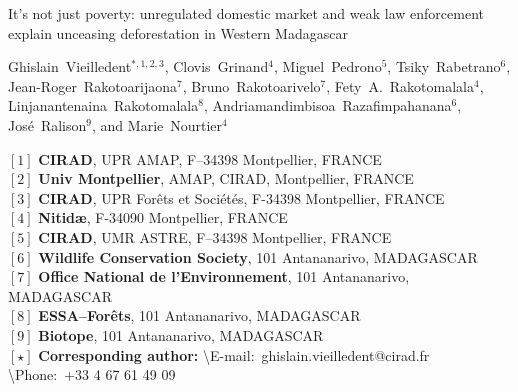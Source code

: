 \begin{center}
  \LARGE{It's not just poverty: unregulated domestic market and weak law enforcement explain unceasing deforestation in Western Madagascar}
\end{center}

\vspace{1cm}

\begin{center}
  \large{Ghislain~Vieilledent$^{*,1,2,3}$, Clovis~Grinand$^4$, Miguel~Pedrono$^5$, Tsiky~Rabetrano$^6$, 
  Jean-Roger~Rakotoarijaona$^7$, Bruno~Rakotoarivelo$^7$, Fety~A.~Rakotomalala$^4$, 
  Linjanantenaina~Rakotomalala$^8$, Andriamandimbisoa~Razafimpahanana$^6$, 
  José~Ralison$^9$, and Marie~Nourtier$^4$}
\end{center}

\vspace{1cm}

{\small
  \begin{flushleft}
    $[1]$ \textbf{CIRAD}, UPR AMAP, F--34398 Montpellier, FRANCE\\ 
    $[2]$ \textbf{Univ Montpellier}, AMAP, CIRAD, Montpellier, FRANCE\\
    $[3]$ \textbf{CIRAD}, UPR Forêts et Sociétés, F-34398 Montpellier, FRANCE\\
    $[4]$ \textbf{Nitid\ae}, F-34090 Montpellier, FRANCE\\
    $[5]$ \textbf{CIRAD}, UMR ASTRE, F--34398 Montpellier, FRANCE\\
    $[6]$ \textbf{Wildlife Conservation Society}, 101 Antananarivo, MADAGASCAR\\
    $[7]$ \textbf{Office National de l'Environnement}, 101 Antananarivo, MADAGASCAR\\
    $[8]$ \textbf{ESSA--Forêts}, 101 Antananarivo, MADAGASCAR\\
    $[9]$ \textbf{Biotope}, 101 Antananarivo, MADAGASCAR
    ~\\
    $[\star]$ \textbf{Corresponding author:}
    \textbackslash{E-mail}:~ghislain.vieilledent@cirad.fr
    \textbackslash{Phone}:~+33 4 67 61 49 09\\
  \end{flushleft}}
\newpage
